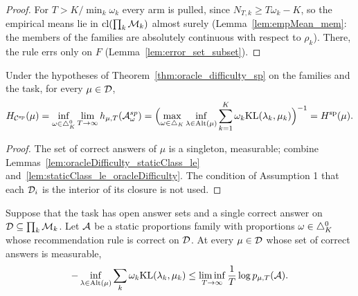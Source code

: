 \begin{proof}
  \leanok
  For $T > K / \min_k \omega_k$ every arm is pulled, since $N_{T,k} \ge T \omega_k - K$, so the
  empirical means lie in $\mathrm{cl}(\prod_k \mathcal{M}_k)$ almost surely (Lemma~\ref{lem:empMean_mem}: the
  members of the families are absolutely continuous with respect to $\rho_k$). There, the rule
  errs only on $F$ (Lemma~\ref{lem:error_set_subset}).
\end{proof}

\begin{theorem}[{\cite[Theorem 1]{D23}}]
  \label{thm:oracle_difficulty_class}
  \leanok
  Under the hypotheses of Theorem~\ref{thm:oracle_difficulty_sp} on the families and the task,
  for every $\mu \in \mathcal{D}$,
  \[ H_{\mathcal{C}^{\mathrm{sp}}}(\mu) = \inf_{\omega \in \triangle_K^0} \lim_{T \to \infty} h_{\mu, T}(\mathcal{A}^{sp}_{\omega})
    = \Bigl( \max_{\omega \in \triangle_K} \inf_{\lambda \in \mathrm{Alt}(\mu)} \sum_{k=1}^K \omega_k
    \mathrm{KL}(\lambda_k, \mu_k) \Bigr)^{-1} = H^{\mathrm{sp}}(\mu). \]
\end{theorem}

\begin{proof}
  \leanok
  The set of correct answers of $\mu$ is a singleton, measurable; combine
  Lemmas~\ref{lem:oracleDifficulty_staticClass_le} and~\ref{lem:staticClass_le_oracleDifficulty}.
  The condition of Assumption 1 that each $\mathcal{D}_i$ is the interior of its closure is not used.
\end{proof}

\begin{lemma}
  \label{lem:static_error_lower}
  \leanok
  Suppose that the task has open answer sets and a single correct answer on $\mathcal{D} \subseteq
  \prod_k \mathcal{M}_k$. Let $\mathcal{A}$ be a static proportions family with proportions $\omega \in
  \triangle_K^0$ whose recommendation rule is correct on $\mathcal{D}$. At every $\mu \in \mathcal{D}$ whose set of
  correct answers is measurable,
  \[ -\inf_{\lambda \in \mathrm{Alt}(\mu)} \sum_k \omega_k \mathrm{KL}(\lambda_k, \mu_k) \le \liminf_{T \to \infty}
    \frac1T \log p_{\mu, T}(\mathcal{A}). \]
\end{lemma}


